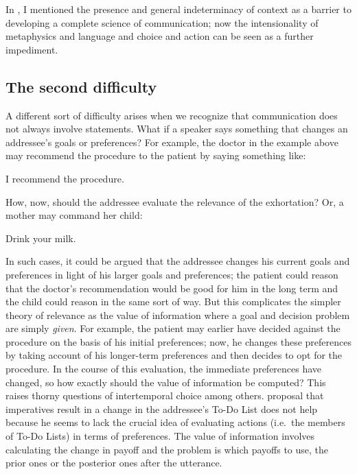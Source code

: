 In , I mentioned the presence and general indeterminacy of context as a barrier to developing a complete science of communication; now the intensionality of metaphysics and language and choice and action can be seen as a further impediment.

\subsection{The second difficulty}

A different sort of difficulty arises when we recognize that communication does not always involve statements. What if a speaker says something that changes an addressee's goals or preferences? For example, the doctor in the example above may recommend the procedure to the patient by saying something like:

\ea I recommend the procedure.\z

How, now, should the addressee evaluate the relevance of the exhortation? Or, a mother may command her child:

\ea Drink your milk.\z

In such cases, it could be argued that the addressee changes his current goals and preferences in light of his larger goals and preferences; the patient could reason that the doctor's recommendation would be good for him in the long term and the child could reason in the same sort of way. But this complicates the simpler theory of relevance as the value of information where a goal and decision problem are simply \emph{given}. For example, the patient may earlier have decided against the procedure on the basis of his initial preferences; now, he changes these preferences by taking account of his longer-term preferences and then decides to opt for the procedure. In the course of this evaluation, the immediate preferences have changed, so how exactly should the value of information be computed? This raises thorny questions of intertemporal choice among others.  proposal that imperatives result in a change in the addressee's To-Do List does not help because he seems to lack the crucial idea of evaluating actions (i.e.\ the members of To-Do Lists) in terms of preferences. The value of information involves calculating the change in payoff and the problem is which payoffs to use, the prior ones or the posterior ones after the utterance.


%

